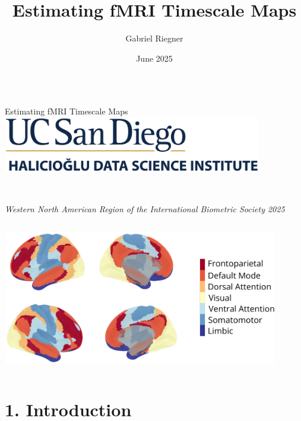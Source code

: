 \documentclass[8pt,aspectratio=169]{beamer}
\title{Estimating fMRI Timescale Maps}
\author[]{Gabriel Riegner}
\date{June 2025}
\begin{document}
\begin{frame}{
\begin{columns}
\hspace{1.4cm} \LARGE Estimating fMRI Timescale Maps 
\includegraphics[width=0.85\textwidth]{docs/wnar/hdsi.png}
\end{columns}}

\\
\vfill
\textit{Western North American Region of the International Biometric Society 2025}
\vfill

\begin{columns}
\tableofcontents[hideallsubsections]
\includegraphics[width=0.9\textwidth]{docs/wnar/toc.pdf}
\end{columns}

\end{frame}

\section{1. Introduction}
\end{document}
